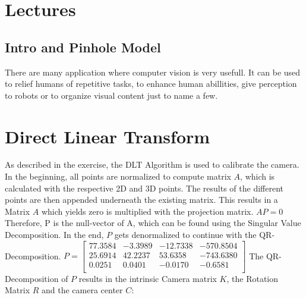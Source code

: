 \documentclass[12pt]{article}
\begin{document}
\maketitle


\section{Lectures}
\subsection{Intro and Pinhole Model}
There are many application where computer vision is very usefull. It can be used to relief humans of repetitive tasks, to enhance human abillities, give perception to robots or to organize visual content just to name a few.
\newline
\section{Direct Linear Transform}
As described in the exercise, the DLT Algorithm is used to calibrate the camera. In the beginning, all points are normalized to compute matrix $A$, which is calculated with the respective 2D and 3D points. The results of the different points are then appended underneath the existing matrix. This results in a Matrix $A$ which yields zero is multiplied with the projection matrix.
 $AP=0$
 Therefore, P is the null-vector of A, which can be found using the Singular Value Decomposition. In the end, $P$ gets denormalized to continue with the QR-Decomposition.
\newline
 $ P = \left[ \begin{array}{rrrr}
 77.3584  & -3.3989 & -12.7338 &-570.8504 \\
 25.6914 &  42.2237 &  53.6358 &-743.6380 \\
 0.0251  &  0.0401 &  -0.0170  & -0.6581 \\
 \end{array}\right] $
\vspace{5mm}
\newline
The QR-Decomposition of $P$ results in the intrinsic Camera matrix $K$, the Rotation Matrix $R$ and the camera center $C$:
\vspace{5mm}
\newline
\end{document}
